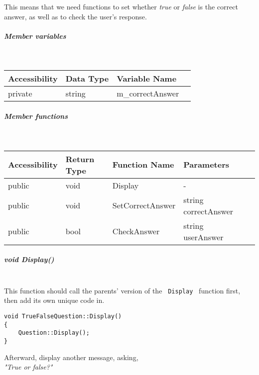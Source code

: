 \documentclass[a4paper,12pt]{book}
\begin{document}
                        This means that we need functions to set whether
                        \textit{ true } or \textit{ false } is the correct
                        answer, as well as to check the user's response.

                        \subparagraph{ Member variables } ~\\
                            
                            \begin{tabular}{ l l l l }
                                Accessibility & Data Type & Variable Name \\ \hline{}
                                private & string & m\_correctAnswer 
                            \end{tabular}
                        
                        \subparagraph{ Member functions } ~\\

                            \begin{tabular}{ l l l l l }
                                Accessibility & Return Type & Function Name & Parameters  \\ \hline{}
                                public & void & Display & -  \\ \hline{}
                                public & void & SetCorrectAnswer & string correctAnswer \\ \hline{}
                                public & bool & CheckAnswer & string userAnswer
                            \end{tabular}

                        \subparagraph{ void Display() } ~\\

                            This function should call the parents' version of
                            the \texttt{ Display } function first, then add
                            its own unique code in.
                            
\begin{lstlisting}[style=code]
void TrueFalseQuestion::Display()
{
    Question::Display();
}
\end{lstlisting}
                            Afterward, display another message, asking, \\
                            \textit{ "True or false?" }
\end{document}
